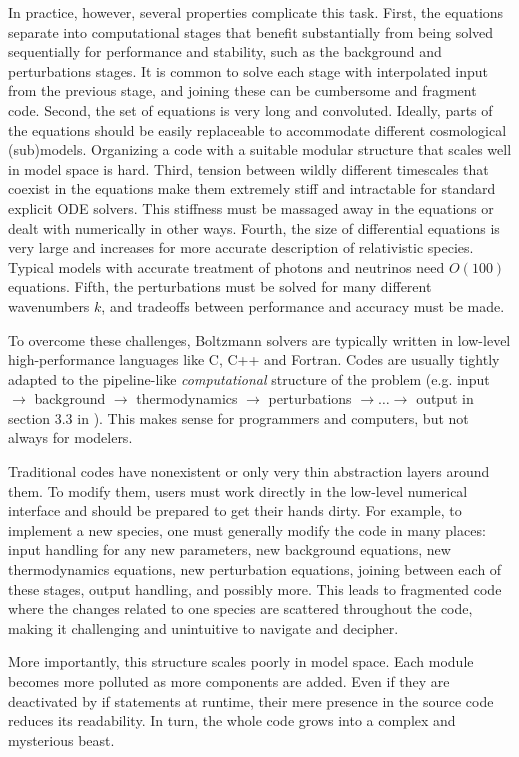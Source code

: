 \documentclass{aa}
\begin{document}
In practice, however, several properties complicate this task.
First, the equations separate into computational stages that benefit substantially from being solved sequentially for performance and stability, such as the background and perturbations stages.
It is common to solve each stage with interpolated input from the previous stage, and joining these can be cumbersome and fragment code.
Second, the set of equations is very long and convoluted.
Ideally, parts of the equations should be easily replaceable to accommodate different cosmological (sub)models.
Organizing a code with a suitable modular structure that scales well in model space is hard.
Third, tension between wildly different timescales that coexist in the equations make them extremely stiff and intractable for standard explicit ODE solvers.
This stiffness must be massaged away in the equations or dealt with numerically in other ways.
Fourth, the size of differential equations is very large and increases for more accurate description of relativistic species.
Typical models with accurate treatment of photons and neutrinos need $O(100)$ equations.
Fifth, the perturbations must be solved for many different wavenumbers $k$, and tradeoffs between performance and accuracy must be made.

To overcome these challenges, Boltzmann solvers are typically written in low-level high-performance languages like C, C++ and Fortran.
Codes are usually tightly adapted to the pipeline-like \emph{computational} structure of the problem (e.g. input $\rightarrow$ background $\rightarrow$ thermodynamics $\rightarrow$ perturbations $\rightarrow \ldots \rightarrow$ output in section 3.3 in \cite{lesgourguesCosmicLinearAnisotropy2011}).
This makes sense for programmers and computers, but not always for modelers.

Traditional codes have nonexistent or only very thin abstraction layers around them.
To modify them, users must work directly in the low-level numerical interface and should be prepared to get their hands dirty.
For example, to implement a new species, one must generally modify the code in many places: input handling for any new parameters, new background equations, new thermodynamics equations, new perturbation equations, joining between each of these stages, output handling, and possibly more.
This leads to fragmented code where the changes related to one species are scattered throughout the code, making it challenging and unintuitive to navigate and decipher.

More importantly, this structure scales poorly in model space.
Each module becomes more polluted as more components are added.
Even if they are deactivated by if statements at runtime, their mere presence in the source code reduces its readability.
In turn, the whole code grows into a complex and mysterious beast.
\end{document}

